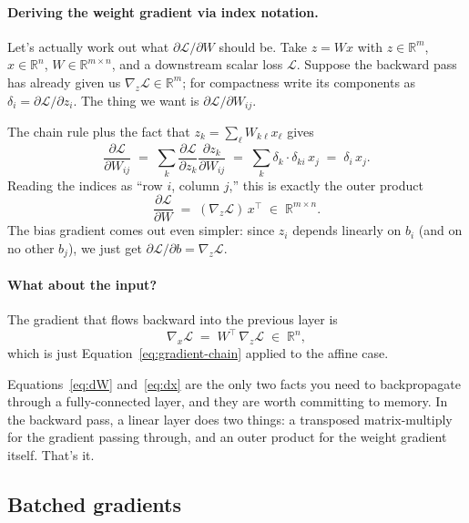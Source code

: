 \documentclass[11pt, a4paper]{article}
\newcommand{\R}{\mathbb{R}}
\newcommand{\T}{^{\!\top}}
\newcommand{\Loss}{\mathcal{L}}
\begin{document}
\paragraph{Deriving the weight gradient via index notation.} Let's actually work out what $\partial \Loss / \partial W$ should be. Take $z = Wx$ with $z \in \R^m$, $x \in \R^n$, $W \in \R^{m \times n}$, and a downstream scalar loss $\Loss$. Suppose the backward pass has already given us $\nabla_z \Loss \in \R^m$; for compactness write its components as $\delta_i = \partial \Loss / \partial z_i$. The thing we want is $\partial \Loss / \partial W_{ij}$.

The chain rule plus the fact that $z_k = \sum_\ell W_{k\ell} x_\ell$ gives
\begin{equation}
    \frac{\partial \Loss}{\partial W_{ij}}
    \;=\; \sum_k \frac{\partial \Loss}{\partial z_k} \frac{\partial z_k}{\partial W_{ij}}
    \;=\; \sum_k \delta_k \cdot \delta_{ki}\, x_j
    \;=\; \delta_i\, x_j.
\end{equation}
Reading the indices as ``row $i$, column $j$,'' this is exactly the outer product
\begin{equation}
\boxed{
    \frac{\partial \Loss}{\partial W} \;=\; (\nabla_z \Loss)\, x\T
    \;\in\; \R^{m \times n}.
}
    \label{eq:dW}
\end{equation}
The bias gradient comes out even simpler: since $z_i$ depends linearly on $b_i$ (and on no other $b_j$), we just get $\partial \Loss / \partial b = \nabla_z \Loss$.

\paragraph{What about the input?} The gradient that flows backward into the previous layer is
\begin{equation}
    \nabla_x \Loss \;=\; W\T\, \nabla_z \Loss \;\in\; \R^n,
    \label{eq:dx}
\end{equation}
which is just Equation~\eqref{eq:gradient-chain} applied to the affine case.

\medskip

Equations~\eqref{eq:dW} and~\eqref{eq:dx} are the only two facts you need to backpropagate through a fully-connected layer, and they are worth committing to memory. In the backward pass, a linear layer does two things: a transposed matrix-multiply for the gradient passing through, and an outer product for the weight gradient itself. That's it.

\subsection{Batched gradients}
\end{document}
